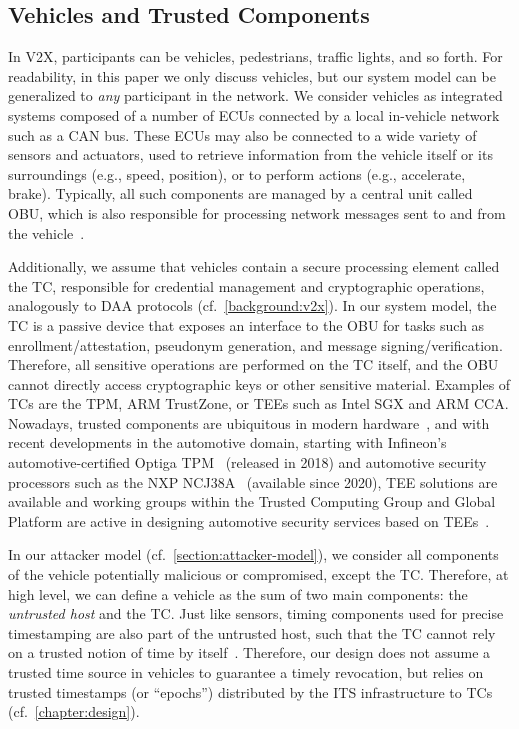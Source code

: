 \subsection{Vehicles and Trusted Components}
\label{section:trusted-component}

In \ac{V2X}, participants can be vehicles, pedestrians, traffic lights, and so
forth. For readability, in this paper we only discuss vehicles, but our system
model can be generalized to \emph{any} participant in the network. We consider
vehicles as integrated systems composed of a number of \acp{ECU} connected by a
local in-vehicle network such as a CAN bus. These \acp{ECU} may also be
connected to a wide variety of sensors and actuators, used to retrieve
information from the vehicle itself or its surroundings (e.g., speed, position),
or to perform actions (e.g., accelerate, brake). Typically, all such components
are managed by a central unit called \ac{OBU}, which is also responsible for
processing network messages sent to and from the
vehicle~\cite{liu2017invehicle}.

Additionally, we assume that vehicles contain a secure processing element called
the \acf{TC}, responsible for credential management and cryptographic
operations, analogously to \ac{DAA} protocols (cf.~\cref{background:v2x}). In
our system model, the \ac{TC} is a passive device that exposes an interface to
the \ac{OBU} for tasks such as enrollment/attestation, pseudonym generation, and
message signing/verification. Therefore, all sensitive operations are performed
on the \ac{TC} itself, and the \ac{OBU} cannot directly access cryptographic
keys or other sensitive material. Examples of \acp{TC} are the \ac{TPM}, ARM
TrustZone, or \acp{TEE} such as Intel \ac{SGX} and ARM \ac{CCA}. Nowadays,
trusted components are ubiquitous in modern hardware~\cite{schneider2022hardware},
and with recent developments in the automotive domain, starting with Infineon's
automotive-certified Optiga TPM~\cite{optigaTPM} (released in 2018) and
automotive security processors such as the NXP NCJ38A~\cite{NXPsecureElement}
(available since 2020), \ac{TEE} solutions are available and working groups
within the Trusted Computing Group and Global Platform are active in designing
automotive security services based on
\acp{TEE}~\cite{TCG,GlobalPlatformAutomotive}.

In our attacker model (cf.~\cref{section:attacker-model}), we consider all
components of the vehicle potentially malicious or compromised, except the \ac{TC}.
Therefore, at high level, we can define a vehicle as the sum of two main
components: the \emph{untrusted host} and the \ac{TC}. Just like sensors, timing
components used for precise timestamping are also part of the untrusted host,
such that the \ac{TC} cannot rely on a trusted notion of time by
itself~\cite{alder2023about,anwar2019applications}. Therefore, our design does
not assume a trusted time source in vehicles to guarantee a timely revocation,
but relies on trusted timestamps (or ``epochs'') distributed by the \ac{ITS}
infrastructure to \acp{TC} (cf.~\cref{chapter:design}).

